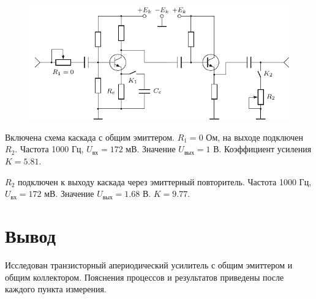 \begin{figure}[H]
	\centering
	\includegraphics[width=\linewidth]{ris/two_cascade}
	\caption{}
	\label{fig:19}
\end{figure}

Включена схема каскада с общим эмиттером. $R_1=0 $ Ом, на выходе подключен $R_2$. Частота 1000 Гц, $U_\text{вх} = 172$ мВ. Значение $U_\text{вых} = 1$ В. Коэффициент усиления $K=5.81$.

$R_2$ подключен к выходу каскада через эмиттерный повторитель. Частота 1000 Гц, $U_\text{вх} = 172$ мВ. Значение $U_\text{вых} = 1.68$ В. $K=9.77$.

\section{Вывод}
Исследован транзисторный апериодический усилитель с общим эмиттером и общим коллектором. Пояснения процессов и результатов приведены после каждого пункта измерения. 



